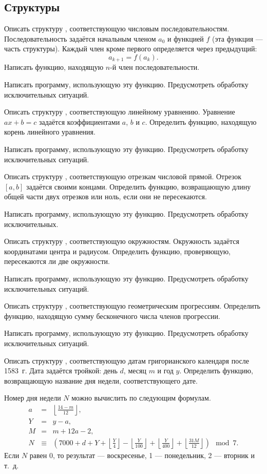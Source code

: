 
\subsection{Структуры}

\task Описать структуру , соответствующую числовым
последовательностям. Последовательность задаётся начальным членом
$a_0$ и функцией $f$ (эта функция — часть структуры). Каждый член
кроме первого определяется через предыдущий:
\[
a_{k+1} = f(a_k).
\]
Написать функцию, находящую $n$-й член последовательности.

Написать программу, использующую эту функцию. Предусмотреть обработку
исключительных ситуаций.

\task Описать структуру , соответствующую линейному
уравнению. Уравнение $ax+b=c$ задаётся коэффициентами $a$, $b$ и $c$.
Определить функцию, находящую корень линейного уравнения.

Написать программу, использующую эту функцию. Предусмотреть обработку
исключительных ситуаций.

\task Описать структуру , соответствующую отрезкам
числовой прямой. Отрезок $[a, b]$ задаётся своими концами. Определить
функцию, возвращающую длину общей части двух отрезков или ноль, если
они не пересекаются.

Написать программу, использующую эту функцию. Предусмотреть обработку
исключительных.

\task Описать структуру , соответствующую
окружностям. Окружность задаётся координатами центра и
радиусом. Определить функцию, проверяющую, пересекаются ли две
окружности.

Написать программу, использующую эту функцию. Предусмотреть обработку
исключительных ситуаций.

\task Описать структуру , соответствующую
геометрическим прогрессиям. Определить функцию, находящую сумму
бесконечного числа членов прогрессии.

Написать программу, использующую эту функцию. Предусмотреть обработку
исключительных ситуаций.

\task Описать структуру , соответствующую датам
григорианского календаря после 1583~г. Дата задаётся тройкой: день
$d$, месяц $m$ и год $y.$ Определить функцию, возвращающую название
дня недели, соответствующего дате.

Номер дня недели $N$ можно вычислить по следующим формулам.
\begin{eqnarray*}
a &=& \left\lfloor\frac{14 - m}{12}\right\rfloor,\\
Y &=& y - a,\\
M &=& m + 12a - 2,\\
N &\equiv& \left( 7000 + d + Y
+ \left\lfloor\frac{Y}{4}\right\rfloor
- \left\lfloor\frac{Y}{100}\right\rfloor
+ \left\lfloor\frac{Y}{400}\right\rfloor
+ \left\lfloor\frac{31M}{12}\right\rfloor
\right) \mod{7}.
\end{eqnarray*}
Если $N$ равен 0, то результат — воскресенье, 1 — понедельник, 2 —
вторник и т.~д.

